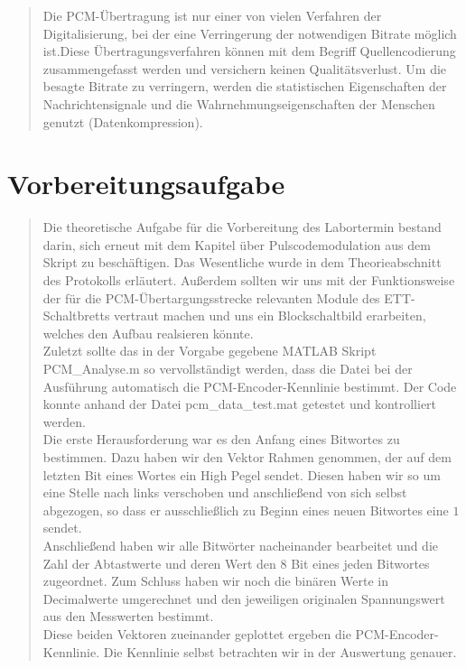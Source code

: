 \begin{quote}
	
	Die PCM-Übertragung ist nur einer von vielen Verfahren der
	Digitalisierung, bei der eine Verringerung der notwendigen Bitrate möglich
	ist.Diese Übertragungsverfahren können mit dem Begriff Quellencodierung
	zusammengefasst werden und versichern keinen Qualitätsverlust. Um die besagte Bitrate zu verringern,
	werden die statistischen Eigenschaften der Nachrichtensignale und die
	Wahrnehmungseigenschaften der Menschen genutzt (Datenkompression).
	
	
	\end{quote}%

\section{Vorbereitungsaufgabe}
\begin{quote}
	
	Die theoretische Aufgabe für die Vorbereitung des Labortermin bestand darin,
	sich erneut mit dem Kapitel über Pulscodemodulation aus dem Skript zu
	beschäftigen. Das Wesentliche wurde in dem Theorieabschnitt des Protokolls
	erläutert. Außerdem sollten wir uns mit der Funktionsweise der für
	die PCM-Übertargungsstrecke relevanten Module des ETT-Schaltbretts vertraut
	machen und uns ein Blockschaltbild erarbeiten, welches den Aufbau realsieren
	könnte.\\
	
	Zuletzt sollte das in der Vorgabe gegebene MATLAB Skript PCM\_Analyse.m so
	vervollständigt werden, dass die Datei bei der Ausführung automatisch die
	PCM-Encoder-Kennlinie bestimmt. Der Code konnte anhand der Datei
	pcm\_data\_test.mat getestet und kontrolliert werden. \\
	
	Die erste Herausforderung war es den Anfang eines Bitwortes zu bestimmen. Dazu haben wir den Vektor Rahmen genommen,
	der auf dem letzten Bit eines Wortes ein High Pegel sendet. Diesen haben wir so um eine Stelle nach links
	verschoben und anschließend von sich selbst abgezogen, so dass er ausschließlich zu Beginn eines
	neuen Bitwortes eine $1$ sendet.\\
	Anschließend haben wir alle Bitwörter nacheinander bearbeitet und die Zahl der Abtastwerte und deren Wert den $8$ Bit
	eines jeden Bitwortes zugeordnet.
	Zum Schluss haben wir noch die binären Werte in Decimalwerte umgerechnet und den jeweiligen originalen Spannungswert
	aus den Messwerten bestimmt.\\
	Diese beiden Vektoren zueinander geplottet ergeben die PCM-Encoder-Kennlinie. Die Kennlinie selbst betrachten wir in
	der Auswertung genauer.
	
\end{quote}%

